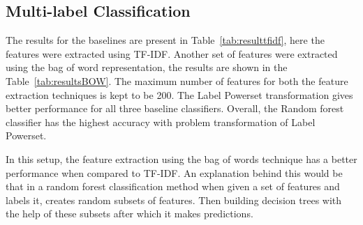 \subsection{Multi-label Classification}
The results for the baselines are present in Table~\ref{tab:resulttfidf}, here the features were extracted using TF-IDF. Another set of features were extracted using the bag of word representation, the results are shown in the Table~\ref{tab:resultsBOW}. The maximum number of features for both the feature extraction techniques is kept to be 200. 
The Label Powerset transformation gives better performance for all three baseline classifiers. Overall, the Random forest classifier has the highest accuracy with problem transformation of Label Powerset. 

In this setup, the feature extraction using the bag of words technique has a better performance when compared to TF-IDF. An explanation behind this would be that in a random forest classification method when given a set of features and labels it, creates random subsets of features. Then building decision trees with the help of these subsets after which it makes predictions. 


\begin{table}[!htb]
\centering
    \caption{Results of predicting super class using TF-IDF feature selection}
    \label{tab:resulttfidf}
\end{table}

